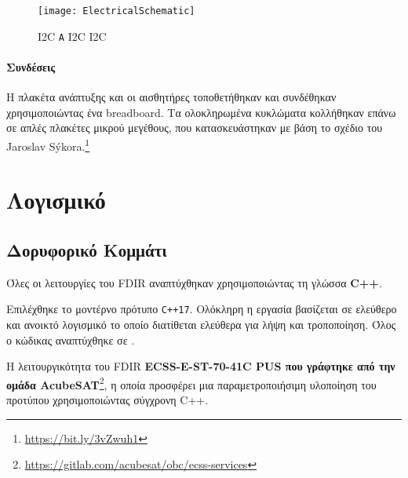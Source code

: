 \documentclass[a4paper,nobib]{tufte-book}
\begin{document}
\begin{figure}[h]
	\texttt{[image: ElectricalSchematic]}
	\caption[Απλοποιημένο σχήματικό της εφαρμογής]{ \ac{I2C}  \texttt{A}  \ac{I2C}  \ac{I2C} }
	\label{fig:schematic}
\end{figure}

\paragraph{Συνδέσεις}
Η πλακέτα ανάπτυξης και οι αισθητήρες τοποθετήθηκαν και συνδέθηκαν χρησιμοποιώντας ένα breadboard. Τα ολοκληρωμένα κυκλώματα κολλήθηκαν επάνω σε απλές πλακέτες μικρού μεγέθους, που κατασκευάστηκαν με βάση το σχέδιο του Jaroslav Sýkora.\footnote[][9cm]{\url{https://bit.ly/3vZwuh1}}

\section{Λογισμικό}

\subsection{Δορυφορικό Κομμάτι}

Όλες οι λειτουργίες του \ac{FDIR} αναπτύχθηκαν χρησιμοποιώντας τη γλώσσα \textbf{C++}.

Επιλέχθηκε το μοντέρνο πρότυπο \texttt{C++17}. Ολόκληρη η εργασία βασίζεται σε ελεύθερο και ανοικτό λογισμικό το οποίο διατίθεται ελεύθερα για λήψη και τροποποίηση. Όλος ο κώδικας αναπτύχθηκε σε .
	
	Η λειτουργικότητα του \ac{FDIR}  \textbf{ECSS-E-ST-70-41C \ac{PUS} που γράφτηκε από την ομάδα AcubeSAT}\footnote{\url{https://gitlab.com/acubesat/obc/ecss-services}}, η οποία προσφέρει μια παραμετροποιήσιμη υλοποίηση του προτύπου χρησιμοποιώντας σύγχρονη C++.
	
\end{document}
